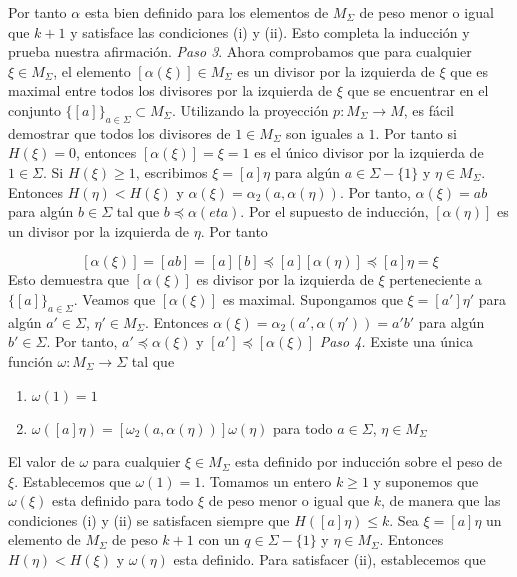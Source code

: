 \documentclass[12pt]{article}
\theoremstyle{definition}
\begin{document}
Por tanto $\alpha$ esta bien definido para los elementos de $M_\Sigma$ de peso menor o igual que $k +1$ y satisface las condiciones (i) y (ii). Esto completa la inducción y prueba nuestra afirmación.
\newline
\newline
\textit{Paso 3}. Ahora comprobamos que para cualquier $\xi\in M_\Sigma$, el elemento $[\alpha(\xi)]\in M_\Sigma$ es un divisor por la izquierda de $\xi$ que es maximal entre todos los divisores por la izquierda de $\xi$ que se encuentrar en el conjunto $\{[a]\}_{a\in\Sigma}\subset M_\Sigma$.
\newline
\newline
Utilizando la proyección $p:M_\Sigma\rightarrow M$, es fácil demostrar que todos los divisores de $1\in M_\Sigma$ son iguales a $1$. Por tanto si $H(\xi)=0$, entonces $[\alpha(\xi)]=\xi=1$ es el único divisor por la izquierda de $1\in\Sigma$. Si $H(\xi)\geq 1$, escribimos $\xi=[a]\eta$ para algún $a\in\Sigma - \{1\}$ y $\eta\in M_\Sigma$. Entonces $H(\eta)< H(\xi)$ y $\alpha(\xi)=\alpha_2(a,\alpha(\eta))$. Por tanto, $\alpha(\xi)=ab$ para algún $b\in\Sigma$ tal que $b\preceq \alpha(eta)$. Por el supuesto de inducción, $[\alpha(\eta)]$ es un divisor por la izquierda de $\eta$. Por tanto

$$[\alpha(\xi)]=[ab]=[a][b]\preceq [a][\alpha(\eta)]\preceq [a]\eta=\xi$$
\newline
\newline
Esto demuestra que $[\alpha(\xi)]$ es divisor por la izquierda  de $\xi$ perteneciente a $\{[a]\}_{a\in\Sigma}$. Veamos que $[\alpha(\xi)]$ es maximal. Supongamos que $\xi=[a']\eta'$
para algún $a'\in\Sigma$, $\eta'\in M_\Sigma$. Entonces $\alpha(\xi) =\alpha_2(a',\alpha(\eta'))=a'b'$ para algún $b'\in\Sigma$. Por tanto, $a'\preceq \alpha(\xi)$ y $[a']\preceq [\alpha(\xi)]$
\newline
\newline
\textit{Paso 4.} Existe una única función $\omega:M_\Sigma\rightarrow\Sigma$ tal que

\begin{enumerate}[label=\roman*.]
\item $\omega(1)=1$
\item $\omega([a]\eta)=[\omega_2(a,\alpha(\eta))]\omega(\eta)$ para todo $a\in\Sigma$, $\eta\in M_\Sigma$
\end{enumerate}

El valor de $\omega$ para cualquier $\xi\in M_\Sigma$ esta definido por inducción sobre el peso de $\xi$. Establecemos que $\omega(1)=1$. Tomamos un entero $k\geq 1$ y suponemos que $\omega(\xi)$ esta definido para todo $\xi$ de peso menor o igual que $k$, de manera que las condiciones (i) y (ii) se satisfacen siempre que $H([a]\eta)\leq k$. Sea $\xi=[a]\eta$ un elemento de $M_\Sigma$ de peso $k+1$ con un $q\in\Sigma - \{1\}$ y $\eta\in M_\Sigma$. Entonces $H(\eta)< H(\xi)$ y $\omega(\eta)$ esta definido. Para satisfacer (ii), establecemos que 
\end{document}

